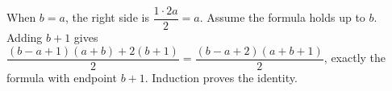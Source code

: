 When $b=a$, the right side is $\dfrac{1\cdot2a}{2}=a$. Assume the formula holds up to $b$. Adding $b+1$ gives $\dfrac{(b-a+1)(a+b)+2(b+1)}{2}=\dfrac{(b-a+2)(a+b+1)}{2}$, exactly the formula with endpoint $b+1$. Induction proves the identity.
